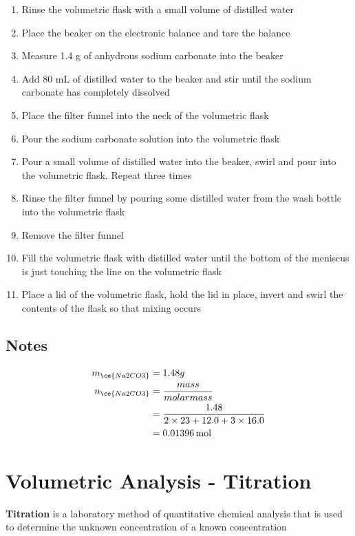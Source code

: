 		\begin{enumerate}
			\item Rinse the volumetric flask with a small volume of distilled water
			\item Place the beaker on the electronic balance and tare the balance
			\item Measure 1.4 g of anhydrous sodium carbonate into the beaker
			\item Add 80 mL of distilled water to the beaker and stir until the sodium carbonate has completely dissolved
			\item Place the filter funnel into the neck of the volumetric flask
			\item Pour the sodium carbonate solution into the volumetric flask
			\item Pour a small volume of distilled water into the beaker, swirl and pour into the volumetric flask. Repeat three times
			\item Rinse the filter funnel by pouring some distilled water from the wash bottle into the volumetric flask
			\item Remove the filter funnel
			\item Fill the volumetric flask with distilled water until the bottom of the meniscus is just touching the line on the volumetric flask
			\item Place a lid of the volumetric flask, hold the lid in place, invert and swirl the contents of the flask so that mixing occurs
		\end{enumerate}

	\subsection{Notes}
	
		\begin{align*}
			m_{\ce{Na2CO3}} &= 1.48 g \\
			n_{\ce{Na2CO3}} &= \frac{mass}{molar mass} \\
			&= \frac{1.48}{2 \times 23 + 12.0 + 3 \times 16.0} \\
			&= 0.01396 \, \text{mol}
		\end{align*}


\section{Volumetric Analysis - Titration}

	\textbf{Titration} is a laboratory method of quantitative chemical analysis that is used to determine the unknown concentration of a known concentration

